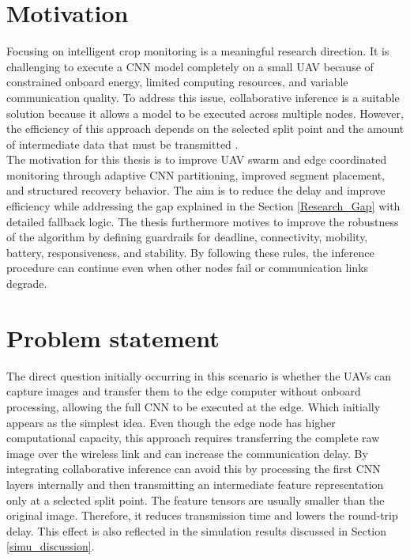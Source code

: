 \section{Motivation}


Focusing on intelligent crop monitoring is a meaningful research direction. It is challenging to execute a CNN model completely on a small UAV because of constrained onboard energy, limited computing resources, and variable communication quality. To address this issue, collaborative inference is a suitable solution because it allows a model to be executed across multiple nodes. However, the efficiency of this approach depends on the selected split point and the amount of intermediate data that must be transmitted \cite{second_ref}.\\

The motivation for this thesis is to improve UAV swarm and edge coordinated monitoring through adaptive CNN partitioning, improved segment placement, and structured recovery behavior. The aim is to reduce the delay and improve efficiency while addressing the gap explained in the Section \ref{Research_Gap} with detailed fallback logic. The thesis furthermore motives to improve the robustness of the algorithm by defining guardrails for deadline, connectivity, mobility, battery, responsiveness, and stability. By following these rules, the inference procedure can continue even when other nodes fail or communication links degrade.



\section{Problem statement}

The direct question initially occurring in this scenario is whether the UAVs can capture images and transfer them to the edge computer without onboard processing, allowing the full CNN to be executed at the edge. Which initially appears as the simplest idea. Even though the edge node has higher computational capacity, this approach requires transferring the complete raw image over the wireless link and can increase the communication delay. By integrating collaborative inference can avoid this by processing the first CNN layers internally and then transmitting an intermediate feature representation only at a selected split point. The feature tensors are usually smaller than the original image. Therefore, it reduces transmission time and lowers the round-trip delay\cite{HybridFastInference2023Zhang}\cite{Mu2024FineGrain}. This effect is also reflected in the simulation results discussed in Section \ref{simu_discussion}.\\



